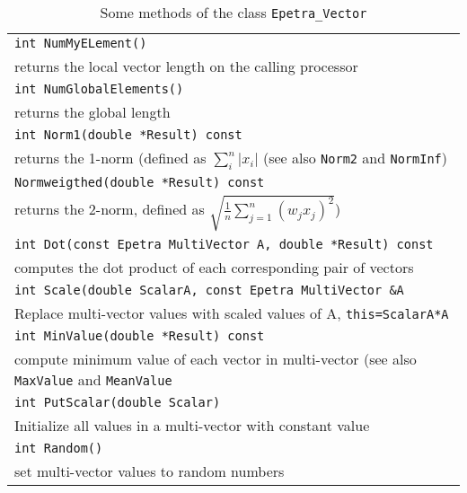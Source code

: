\begin{table}
\begin{center}
\begin{tabular}{ | p{12cm} | }
\hline
\verb!int NumMyELement()! \\
\hspace{1cm} returns the local vector length on the
calling processor \\
\verb!int NumGlobalElements()! \\
\hspace{1cm} returns the  global length\\
\verb!int Norm1(double *Result) const! \\
\hspace{1cm} returns the 1-norm (defined as $\sum_i^n |
  x_i|$ (see also \verb!Norm2! and \verb!NormInf!)\\
\verb!Normweigthed(double *Result) const! \\
\hspace{1cm} returns the  2-norm, defined as
$\sqrt{ \frac{1}{n} \sum_{j=1}^{n} (w_j x_j)^2}$) \\
\verb!int Dot(const Epetra MultiVector A, double *Result) const! \\
\hspace{1cm} computes
the dot product of each corresponding pair of vectors \\
\verb!int Scale(double ScalarA, const Epetra MultiVector &A! \\
\hspace{1cm} 
Replace multi-vector values with scaled values of A,
\verb!this=ScalarA*A! \\
\verb!int MinValue(double *Result) const! \\
\hspace{1cm} compute minimum value of
each vector in multi-vector (see also \verb!MaxValue! and \verb!MeanValue!\\
\verb!int PutScalar(double Scalar)! \\
\hspace{1cm} Initialize all values in a
multi-vector with constant value \\
\verb!int Random()! \\
\hspace{1cm}  set multi-vector values to random numbers \\

\hline
\end{tabular}
\caption{Some methods of the class {\tt Epetra\_Vector}}
\label{tab:distr_vec}
\end{center}
\end{table}


